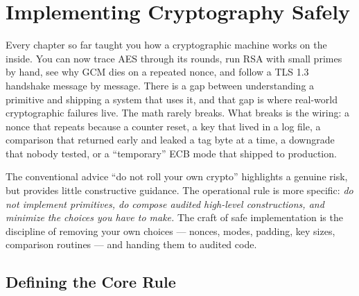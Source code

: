 \chapter{Implementing Cryptography Safely}

Every chapter so far taught you how a cryptographic machine works on the inside.
You can now trace AES through its rounds, run RSA with small primes by hand, see
why GCM dies on a repeated nonce, and follow a TLS 1.3 handshake message by
message. There is a gap between understanding a primitive and shipping a system that
uses it, and that gap is where real-world cryptographic failures live. The math
rarely breaks. What breaks is the wiring: a nonce that repeats because a counter reset, a
key that lived in a log file, a comparison that returned early and leaked a tag
byte at a time, a downgrade that nobody tested, or a ``temporary'' ECB mode that
shipped to production.

The conventional advice ``do not roll your own crypto'' highlights a genuine risk,
but provides little constructive guidance. The operational rule is more specific:
\emph{do not implement primitives, do compose audited high-level
constructions, and minimize the choices you have to make.} The craft of safe
implementation is the discipline of removing your own choices --- nonces, modes, padding,
key sizes, comparison routines --- and handing them to audited code.

\chapterline

\section{Defining the Core Rule}
\label{ch39:one-rule}

